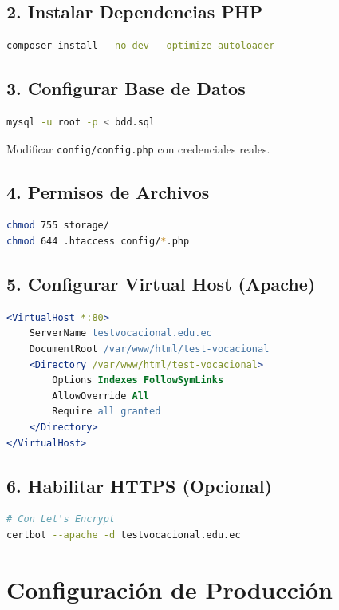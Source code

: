 \documentclass[12pt, a4paper]{report}
\begin{document}
\subsection{2. Instalar Dependencias PHP}
\begin{lstlisting}[language=Bash]
composer install --no-dev --optimize-autoloader
\end{lstlisting}

\subsection{3. Configurar Base de Datos}
\begin{lstlisting}[language=Bash]
mysql -u root -p < bdd.sql
\end{lstlisting}
Modificar \texttt{config/config.php} con credenciales reales.

\subsection{4. Permisos de Archivos}
\begin{lstlisting}[language=Bash]
chmod 755 storage/
chmod 644 .htaccess config/*.php
\end{lstlisting}

\subsection{5. Configurar Virtual Host (Apache)}
\begin{lstlisting}[language=Apache]
<VirtualHost *:80>
    ServerName testvocacional.edu.ec
    DocumentRoot /var/www/html/test-vocacional
    <Directory /var/www/html/test-vocacional>
        Options Indexes FollowSymLinks
        AllowOverride All
        Require all granted
    </Directory>
</VirtualHost>
\end{lstlisting}

\subsection{6. Habilitar HTTPS (Opcional)}
\begin{lstlisting}[language=Bash]
# Con Let's Encrypt
certbot --apache -d testvocacional.edu.ec
\end{lstlisting}

\section{Configuración de Producción}
\end{document}
